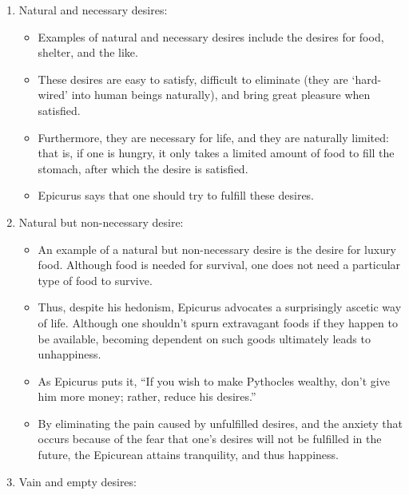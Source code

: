 \documentclass[11pt]{article}
\begin{document}
 





\begin{enumerate}
\item Natural and necessary desires:

  \begin{itemize}
  \item
    Examples of natural and necessary desires include the desires for
    food, shelter, and the like.
  \item
    These desires are easy to satisfy, difficult to eliminate (they are
    `hard-wired' into human beings naturally), and bring great pleasure
    when satisfied.
  \item
    Furthermore, they are necessary for life, and they are naturally
    limited: that is, if one is hungry, it only takes a limited amount
    of food to fill the stomach, after which the desire is satisfied.
  \item
    Epicurus says that one should try to fulfill these desires.
  \end{itemize}
\item Natural but non-necessary desire:

  \begin{itemize}
  \item An example of a natural but non-necessary desire is the desire for
    luxury food. Although food is needed for survival, one does not need
    a particular type of food to survive.
  \item
    Thus, despite his hedonism, Epicurus advocates a surprisingly
    ascetic way of life. Although one shouldn't spurn extravagant foods
    if they happen to be available, becoming dependent on such goods
    ultimately leads to unhappiness.
  \item
    As Epicurus puts it, ``If you wish to make Pythocles wealthy, don't
    give him more money; rather, reduce his desires.''
  \item
    By eliminating the pain caused by unfulfilled desires, and the
    anxiety that occurs because of the fear that one's desires will not
    be fulfilled in the future, the Epicurean attains tranquility,
    and thus happiness.
  \end{itemize}
\item  Vain and empty desires:


\end{enumerate}
\end{document}
